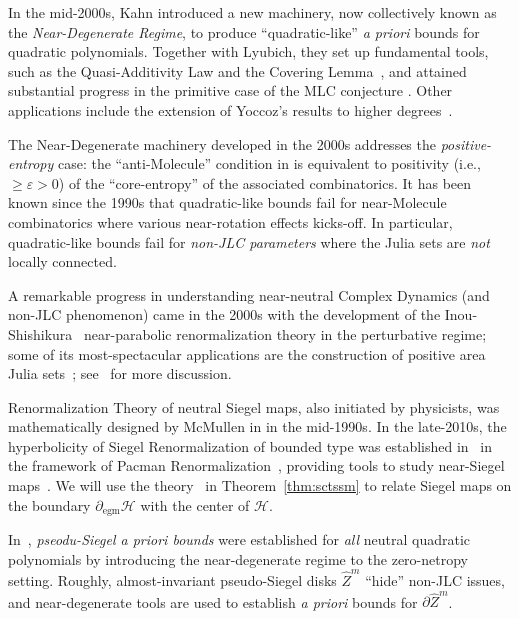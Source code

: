 \documentclass[11pt, reqno]{amsart}
\numberwithin{equation}{section}
\theoremstyle{plain}
\theoremstyle{theorem}
\theoremstyle{plain}
\theoremstyle{definition}
\numberwithin{figure}{section}
\newcommand{\wZ}{{\widehat Z}}
\newcommand{\egm}{{\operatorname{egm}}}
\begin{document}
In the mid-2000s, Kahn \cite{Kah06} introduced a new machinery, now collectively known as the \emph{Near-Degenerate Regime}, to produce ``quadratic-like'' \emph{a priori} bounds for quadratic polynomials. Together with Lyubich, they set up fundamental tools, such as the Quasi-Additivity Law and the Covering Lemma~\cite{KL09}, and attained substantial progress in the primitive case of the MLC conjecture \cite{KL08, KL09c}. Other applications include the extension of Yoccoz’s results to higher degrees~\cite{KLUnicr, AKLS,KvS09,CDKvS}.

The Near-Degenerate machinery developed in the 2000s addresses the \emph{positive-entropy} case: the ``anti-Molecule'' condition in \cite{KL09c} is equivalent to positivity (i.e., $\ge \varepsilon>0$) of the ``core-entropy'' of the associated combinatorics. It has been known since the 1990s that quadratic-like bounds fail for near-Molecule combinatorics where various near-rotation effects kicks-off. In particular, quadratic-like bounds fail for \emph{non-JLC parameters} where the Julia sets are \emph{not} locally connected. 

A remarkable progress in understanding near-neutral Complex Dynamics (and non-JLC phenomenon) came in the 2000s with the development of the Inou-Shishikura~\cite{IS} near-parabolic renormalization theory in the perturbative regime; some of its most-spectacular applications are the construction of positive area Julia sets~\cite{BC12,AL22}; see~\cite[\S1.3]{DL22} for more discussion. 



Renormalization Theory of neutral Siegel maps, also initiated by physicists, was mathematically designed by McMullen in \cite{McMSiegel} in the mid-1990s. In the late-2010s, the hyperbolicity of Siegel Renormalization of bounded type was established in~\cite{DLS20} in the framework of Pacman Renormalization~\cite{DLS20}, providing tools to study near-Siegel maps~\cite{DL23a}. We will use the theory~\cite{DLS20,DL23a} in Theorem~\ref{thm:sctssm} to relate Siegel maps on the boundary $\partial_\egm \mathcal H$ with the center of $\mathcal H$.

In~\cite{DL22}, \emph{pseodu-Siegel a priori bounds} were established for \emph{all} neutral quadratic polynomials by introducing the near-degenerate regime to the zero-netropy setting. Roughly, almost-invariant pseudo-Siegel disks $\wZ^m$ ``hide'' non-JLC issues, and near-degenerate tools are used to establish \emph{a priori} bounds for $\partial \wZ^m$.
\end{document}
